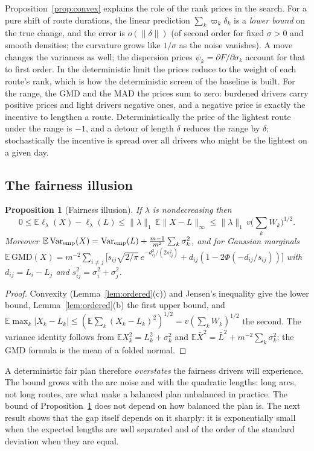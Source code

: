 \documentclass[11pt]{article}
\newtheorem{proposition}[theorem]{Proposition}
\theoremstyle{definition}
\newcommand{\E}{\mathbb{E}}
\newcommand{\lord}{\ell_\lambda}
\begin{document}
Proposition~\ref{prop:convex} explains the role of the rank prices in the
search. For a pure shift of route durations, the linear prediction
$\sum_k\varpi_k\delta_k$ is a \emph{lower bound} on the true change, and the
error is $o(\|\delta\|)$ (of second order for fixed $\sigma>0$ and smooth
densities; the curvature grows like $1/\sigma$ as the noise vanishes). A move changes the variances as well; the
dispersion prices $\psi_k=\partial F/\partial\sigma_k$ account for that to
first order. In the deterministic limit the prices reduce to the weight of
each route's rank, which is how the deterministic screen of the baseline is
built. For the range, the GMD and the MAD the prices sum to zero: burdened
drivers carry positive prices and light drivers negative ones, and a negative
price is exactly the incentive to lengthen a route. Deterministically the
price of the lightest route under the range is $-1$, and a detour of length
$\delta$ reduces the range by $\delta$; stochastically the incentive is spread
over all drivers who might be the lightest on a given day.

\subsection{The fairness illusion}\label{sec:th:illusion}

\begin{proposition}[Fairness illusion]\label{prop:gap}
If $\lambda$ is nondecreasing then
\[
0\le\E\lord(X)-\lord(L)\le\|\lambda\|_1\,\E\|X-L\|_\infty\le\|\lambda\|_1\,v\Big(\sum_kW_k\Big)^{1/2}.
\]
Moreover $\E\operatorname{Var}_{\rm emp}(X)=\operatorname{Var}_{\rm emp}(L)+\frac{m-1}{m^2}\sum_k\sigma_k^2$, and
for Gaussian marginals
$\E\,\mathrm{GMD}(X)=m^{-2}\sum_{i\ne j}\big[s_{ij}\sqrt{2/\pi}\,e^{-d_{ij}^2/(2s_{ij}^2)}+d_{ij}(1-2\Phi(-d_{ij}/s_{ij}))\big]$
with $d_{ij}=L_i-L_j$ and $s_{ij}^2=\sigma_i^2+\sigma_j^2$.
\end{proposition}
\begin{proof}
Convexity (Lemma~\ref{lem:ordered}(c)) and Jensen's inequality give the lower
bound, Lemma~\ref{lem:ordered}(b) the first upper bound, and
$\E\max_k|X_k-L_k|\le(\E\sum_k(X_k-L_k)^2)^{1/2}=v(\sum_kW_k)^{1/2}$ the
second. The variance identity follows from $\E X_k^2=L_k^2+\sigma_k^2$ and
$\E\bar X^2=\bar L^2+m^{-2}\sum_k\sigma_k^2$; the GMD formula is the mean of a
folded normal.
\end{proof}

A deterministic fair plan therefore \emph{overstates} the fairness drivers will
experience. The bound grows with the arc noise and with the quadratic lengths:
long arcs, not long routes, are what make a balanced plan unbalanced in
practice. The bound of Proposition~\ref{prop:gap} does not depend on how
balanced the plan is. The next result shows that the gap itself depends on it
sharply: it is exponentially small when the expected lengths are well
separated and of the order of the standard deviation when they are equal.
\end{document}
